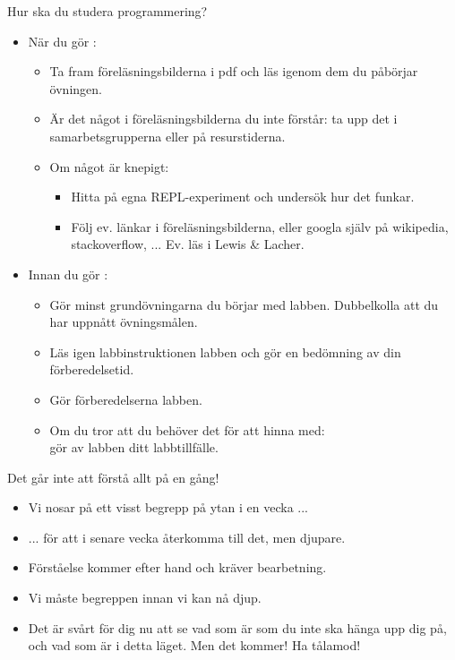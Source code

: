 \begin{Slide}{Hur ska du studera programmering?}
\begin{itemize}
\item När du gör :
\begin{itemize}
\item Ta fram föreläsningsbilderna i pdf och läs igenom dem  du påbörjar övningen.
\item Är det något i föreläsningsbilderna du inte förstår: ta upp det i samarbetsgrupperna eller på resurstiderna.
\item Om något är knepigt:
\begin{itemize}
\item Hitta på egna REPL-experiment och undersök hur det funkar.
\item Följ ev. länkar i föreläsningsbilderna, eller googla själv på wikipedia, stackoverflow, ... Ev. läs i Lewis \& Lacher.
\end{itemize}
\end{itemize}

\item Innan du gör :
\begin{itemize}
\item Gör minst grundövningarna  du börjar med labben. Dubbelkolla att du har uppnått övningsmålen.
\item Läs igen  labbinstruktionen  labben och gör en bedömning av din förberedelsetid.
\item Gör förberedelserna  labben.
\item Om du tror att du behöver det för att hinna med: \\ gör  av labben  ditt labbtillfälle.
\end{itemize}
\end{itemize}

\end{Slide}

\begin{Slide}{Det går inte att förstå allt på en gång!}
\begin{itemize}
\item Vi nosar på ett visst begrepp på ytan i en vecka ...

\item ... för att i senare vecka återkomma till det, men djupare.

\item Förståelse kommer efter hand och kräver bearbetning.

\item Vi måste  begreppen innan vi kan nå djup.

\item Det är svårt för dig nu att se vad som är  som du inte ska hänga upp dig på, och vad som är  i detta läget. Men det kommer! Ha tålamod!
\end{itemize}

\end{Slide}


